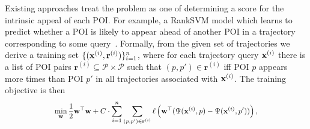Existing approaches treat the problem as one of determining a score for the intrinsic appeal of each POI.
For example, a RankSVM model
which %
learns to predict whether a POI is likely to appear ahead of another POI in a trajectory corresponding to some query~\cite{cikm16paper}.
Formally,
from the given set of trajectories
we derive a training set
$\{ ( \mathbf{x}^{(i)}, \mathbf{r}^{(i)} ) \}_{i = 1}^n$,
where for each trajectory query $\mathbf{x}^{(i)}$ there is a list of POI pairs
$\mathbf{r}^{(i)} \subseteq \mathcal{P} \times \mathcal{P}$
such that
$(p, p') \in \mathbf{r}^{(i)}$
iff
POI $p$ appears more times than POI $p'$ in all trajectories associated with $\mathbf{x}^{(i)}$. %
The training objective is then
\begin{equation*}
\resizebox{0.7\linewidth}{!}{$\displaystyle
\displaystyle \min_{\w} \frac{1}{2} \w^\top \w + C \cdot \sum_{i = 1}^n \sum_{(p, p') \in \mathbf{r}^{(i)}} 
\ell\left( \w^\top ( \Psi( \x^{(i)}, p ) - \Psi( \x^{(i)}, p' ) ) \right),
$}
\end{equation*}
